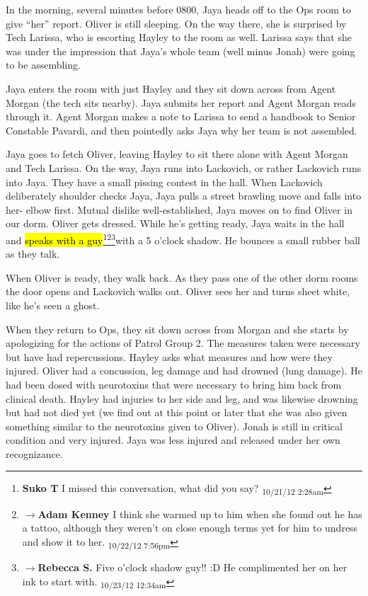 In the morning, several minutes before 0800, Jaya heads off to the Ops room to give ``her'' report.  Oliver is still sleeping.  On the way there, she is surprised by Tech Larissa, who is escorting Hayley to the room as well.  Larissa says that she was under the impression that Jaya's whole team (well minus Jonah) were going to be assembling.



Jaya enters the room with just Hayley and they sit down across from Agent Morgan (the tech sits nearby).  Jaya submits her report and Agent Morgan reads through it.  Agent Morgan makes a note to Larissa to send a handbook to Senior Constable Pavardi, and then pointedly asks Jaya why her team is not assembled.  



Jaya goes to fetch Oliver, leaving Hayley to sit there alone with Agent Morgan and Tech Larissa.  On the way, Jaya runs into Lackovich, or rather Lackovich runs into Jaya.  They have a small pissing contest in the hall.  When Lackovich deliberately shoulder checks Jaya, Jaya pulls a street brawling move and falls into her- elbow first.  Mutual dislike well-established, Jaya moves on to find Oliver in our dorm.  Oliver gets dressed.  While he's getting ready, Jaya waits in the hall and \hl{speaks with a guy}\footnote{\textbf{Suko T }I missed this conversation, what did you say? \textsubscript{10/21/12 2:28am}}\footnote{$\rightarrow$\textbf{Adam Kenney }I think she warmed up to him when she found out he has a tattoo, although they weren't on close enough terms yet for him to undress and show it to her. \textsubscript{10/22/12 7:56pm}}\footnote{$\rightarrow$\textbf{Rebecca S. }Five o'clock shadow guy!! :D  He complimented her on her ink to start with. \textsubscript{10/23/12 12:34am}}with a 5 o'clock shadow. He bounces a small rubber ball as they talk. 



When Oliver is ready, they walk back.  As they pass one of the other dorm rooms the door opens and Lackovich walks out.  Oliver sees her and turns sheet white, like he's seen a ghost.



When they return to Ops, they sit down across from Morgan and she starts by apologizing for the actions of Patrol Group 2.  The measures taken were necessary but have had repercussions.  Hayley asks what measures and how were they injured.  Oliver had a concussion, leg damage and had drowned (lung damage). He had been dosed with neurotoxins that were necessary to bring him back from clinical death.  Hayley had injuries to her side and leg, and was likewise drowning but had not died yet (we find out at this point or later that she was also given something similar to the neurotoxins given to Oliver).  Jonah is still in critical condition and very injured.  Jaya was less injured and released under her own recognizance.



